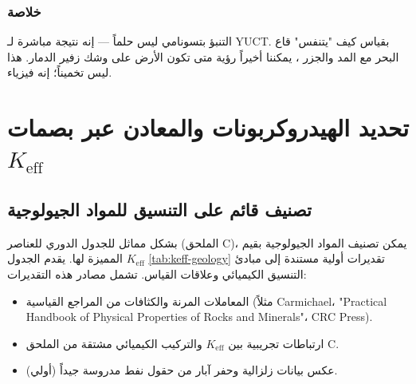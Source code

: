 \documentclass[12pt,a4paper]{article}
\newcommand{\Keff}{K_{\mathrm{eff}}}
\theoremstyle{remark}
\begin{document}
	\subsubsection{خلاصة}
	
	التنبؤ بتسونامي ليس حلماً — إنه نتيجة مباشرة لـ YUCT. بقياس كيف "يتنفس" قاع البحر مع المد والجزر \cite{Tolstoy2013}، يمكننا أخيراً رؤية متى تكون الأرض على وشك زفير الدمار. هذا ليس تخميناً؛ إنه فيزياء.
	
	\section{تحديد الهيدروكربونات والمعادن عبر بصمات \(\Keff\)}
	\label{sec:identification}
	
	\subsection{تصنيف قائم على التنسيق للمواد الجيولوجية}
	
	بشكل مماثل للجدول الدوري للعناصر (الملحق C)، يمكن تصنيف المواد الجيولوجية بقيم \(\Keff\) المميزة لها. يقدم الجدول \ref{tab:keff-geology} تقديرات أولية مستندة إلى مبادئ التنسيق الكيميائي وعلاقات القياس. تشمل مصادر هذه التقديرات:
	\begin{itemize}
		\item المعاملات المرنة والكثافات من المراجع القياسية (مثلاً Carmichael، "Practical Handbook of Physical Properties of Rocks and Minerals"، CRC Press).
		\item ارتباطات تجريبية بين \(\Keff\) والتركيب الكيميائي مشتقة من الملحق C.
		\item عكس بيانات زلزالية وحفر آبار من حقول نفط مدروسة جيداً (أولي).
	\end{itemize}
	
\end{document}
